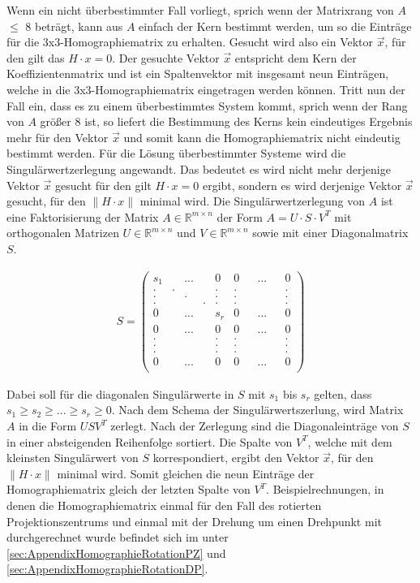 Wenn ein nicht überbestimmter Fall vorliegt, sprich wenn der Matrixrang von $A$ $\leq$ 8 beträgt, kann aus $A$ einfach der Kern bestimmt werden, um so die Einträge für die 3x3-Homographiematrix zu erhalten\cite{HZ,Elements,Schwarz}. Gesucht wird also ein Vektor $\vec{x}$, für den gilt das $H \cdot x = 0$. Der gesuchte Vektor $\vec{x}$ entspricht dem Kern der Koeffizientenmatrix und ist ein Spaltenvektor mit insgesamt neun Einträgen, welche in die 3x3-Homographiematrix eingetragen werden können\cite{HZ,Schwarz}. Tritt nun der Fall ein, dass es zu einem überbestimmtes System kommt, sprich wenn der Rang von $A$ größer 8 ist, so liefert die Bestimmung des Kerns kein eindeutiges Ergebnis mehr für den Vektor $\vec{x}$ und somit kann die Homographiematrix nicht eindeutig bestimmt werden\cite{HZ}. Für die Lösung überbestimmter Systeme wird die Singulärwertzerlegung angewandt\cite{HZ}\cite{Scholz}. Das bedeutet es wird nicht mehr derjenige Vektor $\vec{x}$ gesucht für den gilt $H \cdot x = 0$ ergibt, sondern es wird derjenige Vektor $\vec{x}$ gesucht, für den \ensuremath{\parallel H \cdot x\parallel} minimal wird\cite{HZ,Schwarz}. Die Singulärwertzerlegung von $A$ ist eine Faktorisierung der Matrix \ensuremath{A \in \mathbb{R}^{m \times n}} der Form \ensuremath{A = U \cdot S \cdot V^T} mit orthogonalen Matrizen \ensuremath{U \in \mathbb{R}^{m \times n}} und \ensuremath{V \in \mathbb{R}^{m \times n}} sowie mit einer Diagonalmatrix $S$. 

\begin{gather}
	S = \begin{pmatrix}
		s_1&&...&&0&0&&...&&0\\
		.&.&&&.&.&&&&.\\
		.&&.&&.&.&&&&.\\
		.&&&.&.&.&&&&.\\
		0&&...&&s_r&0&&...&&0\\	
		0&&...&&0&0&&...&&0\\
		.&&&&.&.&&&&.\\
		.&&&&.&.&&&&.\\	
		.&&&&.&.&&&&.\\	
		0&&...&&0&0&&...&&0\\	
	\end{pmatrix}
\end{gather}

Dabei soll für die diagonalen Singulärwerte in $S$ mit $s_1$ bis $s_r$ gelten, dass \ensuremath{s_1 \geq s_2 \geq ... \geq s_r \ge 0 }\cite{Scholz}. Nach dem Schema der Singulärwertszerlung, wird Matrix $A$ in die Form $USV^T$ zerlegt. Nach der Zerlegung sind die Diagonaleinträge von $S$ in einer absteigenden Reihenfolge sortiert. Die Spalte von $V^T$, welche mit dem kleinsten Singulärwert von $S$ korrespondiert, ergibt den Vektor $\vec{x}$, für den \ensuremath{\parallel H \cdot x\parallel} minimal wird. Somit gleichen die neun Einträge der Homographiematrix gleich der letzten Spalte von $V^T$. Beispielrechnungen, in denen die Homographiematrix einmal für den Fall des rotierten Projektionszentrums und einmal mit der Drehung um einen Drehpunkt mit durchgerechnet wurde befindet sich im   unter \ref{sec:AppendixHomographieRotationPZ} und \ref{sec:AppendixHomographieRotationDP}.




